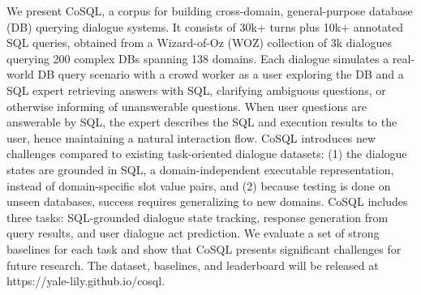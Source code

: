 We present CoSQL, a corpus for building cross-domain, general-purpose database (DB) querying dialogue systems. It consists of 30k+ turns plus 10k+ annotated SQL queries, obtained from a Wizard-of-Oz (WOZ) collection of 3k dialogues querying 200 complex DBs spanning 138 domains. Each dialogue simulates a real-world DB query scenario with a crowd worker as a user exploring the DB and a SQL expert retrieving answers with SQL, clarifying ambiguous questions, or otherwise informing of unanswerable questions. When
user questions are answerable by SQL, the expert describes the SQL and execution results to the user, hence maintaining a natural interaction flow. CoSQL introduces new challenges compared to existing task-oriented dialogue datasets: (1) the dialogue states are grounded
in SQL, a domain-independent executable representation, instead of domain-specific slot value pairs, and (2) because testing is done on unseen databases, success requires generalizing to new domains. CoSQL includes three tasks: SQL-grounded dialogue state tracking, response generation from query results, and user dialogue act prediction. We evaluate a set of strong baselines for each task and show that CoSQL presents significant challenges for future research. The dataset, baselines, and leaderboard will be released at https://yale-lily.github.io/cosql.